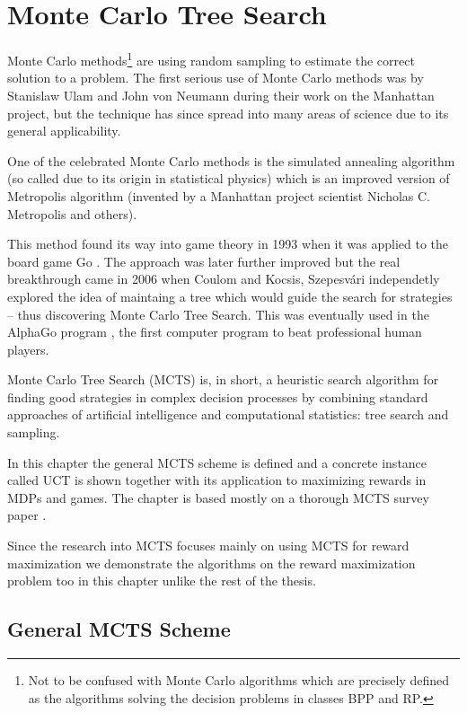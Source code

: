 \chapter{Monte Carlo Tree Search}
\label{ch_mcts}

Monte Carlo methods\footnote{Not to be confused with
Monte Carlo algorithms which are precisely defined as the algorithms
solving the decision problems in classes BPP and RP.} are using random sampling to estimate the correct
solution to a problem. The first serious use of Monte Carlo methods was
by Stanislaw Ulam and John von Neumann during their work on the
Manhattan project, but the technique has since spread into many areas of
science due to its general applicability.

One of the celebrated Monte Carlo methods
is the simulated annealing algorithm (so called due to its
origin in statistical physics) which is an improved version of
Metropolis algorithm (invented by a Manhattan project scientist
Nicholas C. Metropolis and others).

This method found its way into game
theory in 1993 when it was applied to the board game Go
\parencite{MonteCarloGo}. The approach was later further improved
\parencite{MonteCarloGoDevel} but the real breakthrough came in 2006
when Coulom \parencite{Coulom} and Kocsis, Szepesvári \parencite{Kocsis}
independetly explored the idea of maintaing a tree which would guide the
search for strategies -- thus discovering Monte Carlo Tree Search.
This was eventually used in the AlphaGo program
\parencite{alphago}, the first
computer program to beat professional human players.

Monte Carlo Tree Search (MCTS) is, in short, a
heuristic search algorithm for finding good strategies in complex
decision processes by combining standard approaches of artificial
intelligence and computational statistics: tree search and sampling.

In this chapter the general MCTS scheme is defined and a concrete instance
called UCT is shown together with its application to maximizing rewards
in MDPs and games. The chapter is based mostly on a thorough MCTS survey
paper \parencite{mcts_survey}.

Since the research into MCTS focuses mainly on using MCTS for reward
maximization we demonstrate the algorithms on the reward maximization
problem too in this chapter unlike the rest of the thesis.

\section{General MCTS Scheme}

